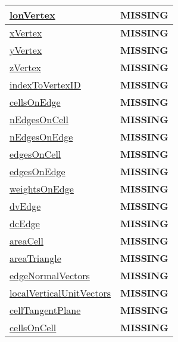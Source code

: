 {\begin{center}
\begin{longtable}{| p{2.0in} | p{4.0in} |}
    \hline
    \hyperref[subsec:var_sec_mesh_lonVertex]{lonVertex} & {\bf \color{red} MISSING} \\
    \hline
    \hyperref[subsec:var_sec_mesh_xVertex]{xVertex} & {\bf \color{red} MISSING} \\
    \hline
    \hyperref[subsec:var_sec_mesh_yVertex]{yVertex} & {\bf \color{red} MISSING} \\
    \hline
    \hyperref[subsec:var_sec_mesh_zVertex]{zVertex} & {\bf \color{red} MISSING} \\
    \hline
    \hyperref[subsec:var_sec_mesh_indexToVertexID]{indexToVertexID} & {\bf \color{red} MISSING} \\
    \hline
    \hyperref[subsec:var_sec_mesh_cellsOnEdge]{cellsOnEdge} & {\bf \color{red} MISSING} \\
    \hline
    \hyperref[subsec:var_sec_mesh_nEdgesOnCell]{nEdgesOnCell} & {\bf \color{red} MISSING} \\
    \hline
    \hyperref[subsec:var_sec_mesh_nEdgesOnEdge]{nEdgesOnEdge} & {\bf \color{red} MISSING} \\
    \hline
    \hyperref[subsec:var_sec_mesh_edgesOnCell]{edgesOnCell} & {\bf \color{red} MISSING} \\
    \hline
    \hyperref[subsec:var_sec_mesh_edgesOnEdge]{edgesOnEdge} & {\bf \color{red} MISSING} \\
    \hline
    \hyperref[subsec:var_sec_mesh_weightsOnEdge]{weightsOnEdge} & {\bf \color{red} MISSING} \\
    \hline
    \hyperref[subsec:var_sec_mesh_dvEdge]{dvEdge} & {\bf \color{red} MISSING} \\
    \hline
    \hyperref[subsec:var_sec_mesh_dcEdge]{dcEdge} & {\bf \color{red} MISSING} \\
    \hline
    \hyperref[subsec:var_sec_mesh_areaCell]{areaCell} & {\bf \color{red} MISSING} \\
    \hline
    \hyperref[subsec:var_sec_mesh_areaTriangle]{areaTriangle} & {\bf \color{red} MISSING} \\
    \hline
    \hyperref[subsec:var_sec_mesh_edgeNormalVectors]{edgeNormalVectors} & {\bf \color{red} MISSING} \\
    \hline
    \hyperref[subsec:var_sec_mesh_localVerticalUnitVectors]{localVerticalUnitVectors} & {\bf \color{red} MISSING} \\
    \hline
    \hyperref[subsec:var_sec_mesh_cellTangentPlane]{cellTangentPlane} & {\bf \color{red} MISSING} \\
    \hline
    \hyperref[subsec:var_sec_mesh_cellsOnCell]{cellsOnCell} & {\bf \color{red} MISSING} \\

\end{longtable}
\end{center}}
